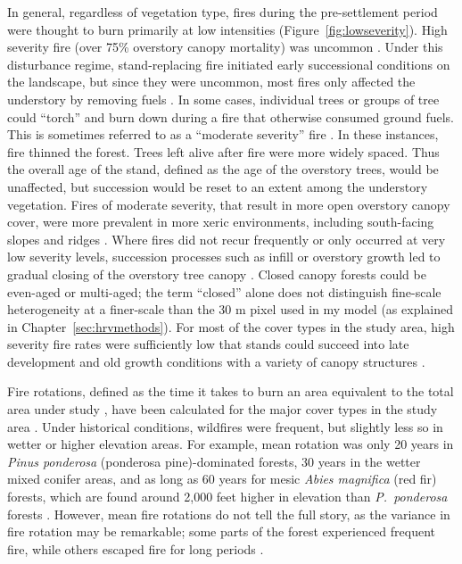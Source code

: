 In general, regardless of vegetation type, fires during the pre-settlement period were thought to burn primarily at low intensities (Figure~\ref{fig:lowseverity}). High severity fire (over 75\% overstory canopy mortality) was uncommon \citep{Skinner1996, SNEP1996a,Mallek2013,Stephens2015}. Under this disturbance regime, stand-replacing fire initiated early successional conditions on the landscape, but since they were uncommon, most fires only affected the understory by removing fuels \citep{Skinner1996, SNEP1996a,Mallek2013}. In some cases, individual trees or groups of tree could ``torch'' and burn down during a fire that otherwise consumed ground fuels. This is sometimes referred to as a ``moderate severity'' fire \citep{Beaty2001}. In these instances, fire thinned the forest. Trees left alive after fire were more widely spaced. Thus the overall age of the stand, defined as the age of the overstory trees, would be unaffected, but succession would be reset to an extent among the understory vegetation. Fires of moderate severity, that result in more open overstory canopy cover, were more prevalent in more xeric environments, including south-facing slopes and ridges \citep{SNEP1996a,SNEP1996,Mallek2013,Safford2014}. Where fires did not recur frequently or only occurred at very low severity levels, succession processes such as infill or overstory growth led to gradual closing of the overstory tree canopy \citep{SNEP1996a,McKenzie2004}. Closed canopy forests could be even-aged or multi-aged; the term ``closed'' alone does not distinguish fine-scale heterogeneity at a finer-scale than the 30 m pixel used in my model (as explained in Chapter~\ref{sec:hrvmethods}). For most of the cover types in the study area, high severity fire rates were sufficiently low that stands could succeed into late development and old growth conditions with a variety of canopy structures \citep{SNEP1996a,SNEP1996,Mallek2013,Safford2014}. 


Fire rotations, defined as the time it takes to burn an area equivalent to the total area under study \citep{Agee1993}, have been calculated for the major cover types in the study area \citep{Mallek2013}. Under historical conditions, wildfires were frequent, but slightly less so in wetter or higher elevation areas. For example, mean rotation was only 20 years in \emph{Pinus ponderosa} (ponderosa pine)-dominated forests, 30 years in the wetter mixed conifer areas, and as long as 60 years for mesic \emph{Abies magnifica} (red fir) forests, which are found around 2,000 feet higher in elevation than \emph{P.~ponderosa} forests \citep{Mallek2013}. However, mean fire rotations do not tell the full story, as the variance in fire rotation may be remarkable; some parts of the forest experienced frequent fire, while others escaped fire for long periods \citep{Mallek2013}.



